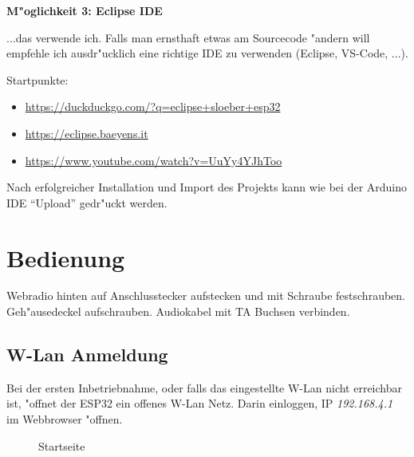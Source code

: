 \documentclass[ngerman,11pt,parskip=half] {scrartcl}
\begin{document}
\textbf{M"oglichkeit 3: Eclipse IDE}

...das verwende ich. Falls man ernsthaft etwas am Sourcecode "andern will empfehle ich ausdr"ucklich eine richtige IDE zu verwenden (Eclipse, VS-Code, ...).

Startpunkte:
\begin{itemize}
\item \url{https://duckduckgo.com/?q=eclipse+sloeber+esp32}
\item \url{https://eclipse.baeyens.it}
\item \url{https://www.youtube.com/watch?v=UuYy4YJhToo}
\end{itemize}

Nach erfolgreicher Installation und Import des Projekts kann wie bei der Arduino IDE "`Upload"' gedr"uckt werden.

\section{Bedienung} \label{sec:bedienung}

Webradio hinten auf Anschlusstecker aufstecken und mit Schraube festschrauben. Geh"ausedeckel aufschrauben. Audiokabel mit TA Buchsen verbinden.

\subsection{W-Lan Anmeldung} \label{sec:bedienung:wlan}

Bei der ersten Inbetriebnahme, oder falls das eingestellte W-Lan nicht erreichbar ist, "offnet der ESP32 ein offenes W-Lan Netz. Darin einloggen, IP \emph{192.168.4.1} im Webbrowser "offnen.

\begin{figure}[H]
\centering
{}
\caption{Startseite} \label{fig:1}
\end{figure}
\end{document}
